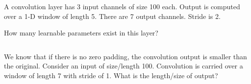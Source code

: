 \begin{frame}
\section{}
A convolution layer has 3 input channels of size 100 each. Output is computed over a 1-D window of length 5. There are 7 output channels. Stride is 2.

How many learnable parameters exist in this layer?
\end{frame}

\begin{frame}
\section{}
We know that if there is no zero padding, the convolution output is smaller than the original. Consider an input of size/length 100. Convolution is carried over a window of length 7 with stride of 1. What is the length/size of output?
\end{frame}
